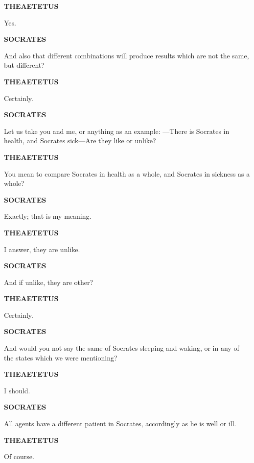 \documentclass[11pt,letter]{article}
\begin{document}
\par \textbf{THEAETETUS}
\par   Yes.

\par \textbf{SOCRATES}
\par   And also that different combinations will produce results which are not the same, but different?

\par \textbf{THEAETETUS}
\par   Certainly.

\par \textbf{SOCRATES}
\par   Let us take you and me, or anything as an example: —There is Socrates in health, and Socrates sick—Are they like or unlike?

\par \textbf{THEAETETUS}
\par   You mean to compare Socrates in health as a whole, and Socrates in sickness as a whole?

\par \textbf{SOCRATES}
\par   Exactly; that is my meaning.

\par \textbf{THEAETETUS}
\par   I answer, they are unlike.

\par \textbf{SOCRATES}
\par   And if unlike, they are other?

\par \textbf{THEAETETUS}
\par   Certainly.

\par \textbf{SOCRATES}
\par   And would you not say the same of Socrates sleeping and waking, or in any of the states which we were mentioning?

\par \textbf{THEAETETUS}
\par   I should.

\par \textbf{SOCRATES}
\par   All agents have a different patient in Socrates, accordingly as he is well or ill.

\par \textbf{THEAETETUS}
\par   Of course.
\end{document}
